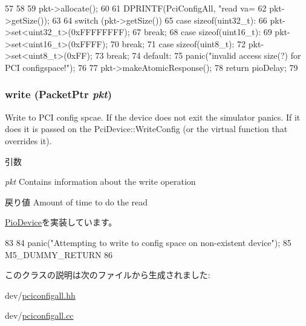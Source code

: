 \begin{DoxyCode}
57 {
58 
59     pkt->allocate();
60 
61     DPRINTF(PciConfigAll, "read  va=%
62             pkt->getSize());
63 
64     switch (pkt->getSize()) {
65       case sizeof(uint32_t):
66          pkt->set<uint32_t>(0xFFFFFFFF);
67          break;
68       case sizeof(uint16_t):
69          pkt->set<uint16_t>(0xFFFF);
70          break;
71       case sizeof(uint8_t):
72          pkt->set<uint8_t>(0xFF);
73          break;
74       default:
75         panic("invalid access size(?) for PCI configspace!\n");
76     }
77     pkt->makeAtomicResponse();
78     return pioDelay;
79 }
\end{DoxyCode}
\hypertarget{classPciConfigAll_a4cefab464e72b5dd42c003a0a4341802}{
\subsubsection[{write}]{ write ({\bf PacketPtr} {\em pkt})}}
\label{classPciConfigAll_a4cefab464e72b5dd42c003a0a4341802}
Write to PCI config spcae. If the device does not exit the simulator panics. If it does it is passed on the PciDevice::WriteConfig (or the virtual function that overrides it). 
\begin{DoxyParams}{引数}
\item[{\em pkt}]Contains information about the write operation \end{DoxyParams}
\begin{DoxyReturn}{戻り値}
Amount of time to do the read 
\end{DoxyReturn}


\hyperlink{classPioDevice_afe8371668d023bb2516b286e5e399b6f}{PioDevice}を実装しています。


\begin{DoxyCode}
83 {
84     panic("Attempting to write to config space on non-existent device\n");
85     M5_DUMMY_RETURN
86 }
\end{DoxyCode}


このクラスの説明は次のファイルから生成されました:\begin{DoxyCompactItemize}
\item 
dev/\hyperlink{pciconfigall_8hh}{pciconfigall.hh}\item 
dev/\hyperlink{pciconfigall_8cc}{pciconfigall.cc}\end{DoxyCompactItemize}
